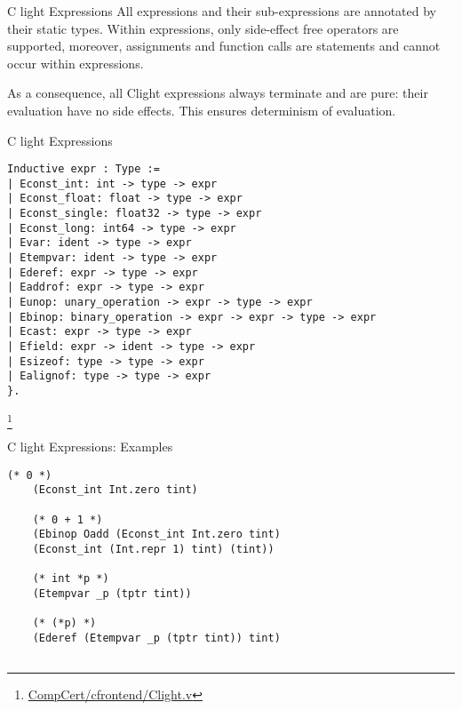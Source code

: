 \documentclass{beamer}
\begin{document}
  \begin{frame}{C light Expressions}
    All expressions and their sub-expressions
are annotated by their static types. Within expressions, only side-effect free operators are supported, moreover, assignments and
function calls are statements and cannot occur within expressions.
\bigskip

As a
consequence, all Clight expressions always terminate and are pure: their evaluation
have no side effects. This ensures determinism of evaluation.
    \end{frame}

 \begin{frame}[fragile]{C light Expressions}
   
  \begin{lstlisting}[language=Coq]
Inductive expr : Type :=
| Econst_int: int -> type -> expr      
| Econst_float: float -> type -> expr 
| Econst_single: float32 -> type -> expr 
| Econst_long: int64 -> type -> expr 
| Evar: ident -> type -> expr 
| Etempvar: ident -> type -> expr 
| Ederef: expr -> type -> expr 
| Eaddrof: expr -> type -> expr
| Eunop: unary_operation -> expr -> type -> expr
| Ebinop: binary_operation -> expr -> expr -> type -> expr
| Ecast: expr -> type -> expr   
| Efield: expr -> ident -> type -> expr
| Esizeof: type -> type -> expr 
| Ealignof: type -> type -> expr
}. 
\end{lstlisting}\footnote{\url{CompCert/cfrontend/Clight.v}}


\end{frame}


    

\begin{frame}[fragile]{C light Expressions: Examples}

  \begin{lstlisting}[language=Coq]
    (* 0 *)
    (Econst_int Int.zero tint) 

    (* 0 + 1 *)
    (Ebinop Oadd (Econst_int Int.zero tint)
    (Econst_int (Int.repr 1) tint) (tint))

    (* int *p *)
    (Etempvar _p (tptr tint)) 
    
    (* (*p) *)
    (Ederef (Etempvar _p (tptr tint)) tint)


  \end{lstlisting}
  


\end{frame}
\end{document}

